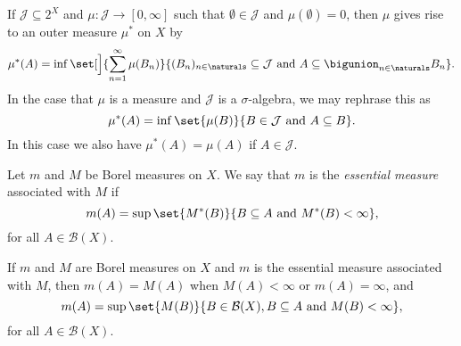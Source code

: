 \documentclass[article, a4paper, 11pt, oneside]{memoir}
\numberwithin{equation}{chapter}
\newcommand{\calB}{\mathcal{B}}
\newcommand{\borel}[1]{\calB(#1)}
\begin{document}
\newcommand{\calJ}{\mathcal{J}}
\newcommand{\powerset}[1]{2^{#1}}

If $\calJ \subseteq \powerset{X}$ and $\mu \colon \calJ \to [0,\infty]$ such that $\emptyset \in \calJ$ and $\mu(\emptyset) = 0$, then $\mu$ gives rise to an outer measure $\mu^*$ on $X$ by
%
\begin{equation*}
    \mu^*(A)
        = \inf \set[\Big]{
            \sum_{n=1}^\infty \mu(B_n)
        }{
            (B_n)_{n \in \naturals} \subseteq \calJ
            \text{ and }
            A \subseteq \bigunion_{n \in \naturals} B_n
        }.
\end{equation*}
%
In the case that $\mu$ is a measure and $\calJ$ is a $\sigma$-algebra, we may rephrase this as
%
\begin{equation*}
    \mu^*(A)
        = \inf \set{
            \mu(B)
        }{
            B \in \calJ
            \text{ and }
            A \subseteq B
        }.
\end{equation*}
%
In this case we also have $\mu^*(A) = \mu(A)$ if $A \in \calJ$.

\begin{definition}
    Let $m$ and $M$ be Borel measures on $X$. We say that $m$ is the \emph{essential measure} associated with $M$ if
    \begin{equation*}
        m(A)
            = \sup \set{ M^*(B) }{ B \subseteq A \text{ and } M^*(B) < \infty },
    \end{equation*}
    for all $A \in \borel{X}$.
\end{definition}


\begin{lemma}
    If $m$ and $M$ are Borel measures on $X$ and $m$ is the essential measure associated with $M$, then $m(A) = M(A)$ when $M(A) < \infty$ or $m(A) = \infty$, and
    \begin{equation}
        \label{eq:essential-measure-equivalent-formula}
        m(A)
            = \sup \set{ M(B) }{ B \in \borel{X}, B \subseteq A \text{ and } M(B) < \infty },
    \end{equation}
    for all $A \in \borel{X}$.
\end{lemma}
\end{document}

